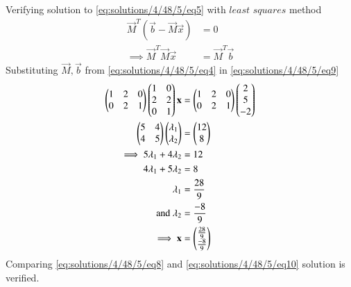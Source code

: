 \newpage
Verifying solution to \eqref{eq:solutions/4/48/5/eq5} with $\textit{least squares}$ method
\begin{align}
	\vec{M}^T(\vec{b} - \vec{M}\vec{x}) &= 0\\
	\label{eq:solutions/4/48/5/eq9}\implies \vec{M}^T\vec{M}\vec{x} &= \vec{M}^T\vec{b}
\end{align}
Substituting $\vec{M}, \vec{b}$ from \eqref{eq:solutions/4/48/5/eq4} in \eqref{eq:solutions/4/48/5/eq9}
\begin{align}
	\begin{pmatrix}1 & 2 & 0\\0 & 2 & 1\end{pmatrix}\begin{pmatrix}1 & 0\\2 & 2\\0 & 1\end{pmatrix}\mathbf{x} &= \begin{pmatrix}1 & 2 & 0\\0 & 2 & 1\end{pmatrix}\begin{pmatrix}2\\5\\-2\end{pmatrix}\\
	\begin{pmatrix}5 & 4\\4 & 5\end{pmatrix}\begin{pmatrix}\lambda_1\\\lambda_2\end{pmatrix} &= \begin{pmatrix}12\\8\end{pmatrix}\\
	\implies5\lambda_1 + 4\lambda_2&= 12\\
	4\lambda_1 + 5\lambda_2&= 8\\
	\lambda_1 &= \frac{28}{9}\\
	\text{and }\lambda_2 &= \frac{-8}{9}\\
	\label{eq:solutions/4/48/5/eq10}\implies\mathbf{x} &= \begin{pmatrix}\frac{28}{9}\\\frac{-8}{9}\end{pmatrix}
\end{align}
Comparing \eqref{eq:solutions/4/48/5/eq8} and \eqref{eq:solutions/4/48/5/eq10} solution is verified.
